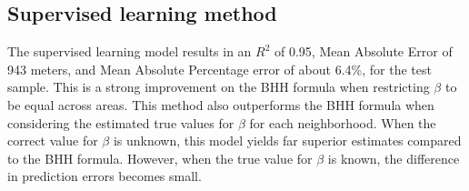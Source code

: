 \subsection{Supervised learning method}
The supervised learning model results in an $R^2$ of 0.95, Mean Absolute Error of 943 meters, and Mean Absolute Percentage error of about 6.4\%, for the test
sample. This is a strong improvement on the BHH formula when restricting $\beta$ to be equal across areas. This method also outperforms the BHH formula
when considering the estimated true values for $\beta$ for each neighborhood. 
When the correct value for $\beta$ is unknown, this model yields far superior estimates compared to the BHH formula. However, when the true value for 
$\beta$ is known, the difference in prediction errors becomes small.
